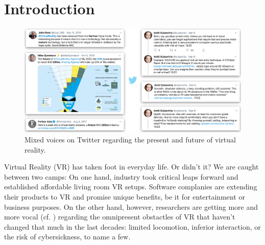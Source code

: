 %
\chapter{Introduction}
\label{sec:intro}


\begin{figure}[!b]
\centering
\includegraphics[width=1.0\columnwidth]{content/images/vr_tweets.jpg}
\caption{Mixed voices on Twitter regarding the present and future of virtual reality.}
\label{fig:twitter}
\end{figure}




Virtual Reality (VR) has taken foot in everyday life. Or didn't it? We are caught between two camps: On one hand, industry took critical leaps forward and established affordable living room VR setups. Software complanies are extending their products to VR and promise unique benefits, be it for entertainment or business purposes. On the other hand, however, researchers are getting more and more vocal (cf. ) regarding the omnipresent obstactles of VR that haven't changed that much in the last decades: limited locomotion, inferior interaction, or the risk of cybersickness, to name a few.





